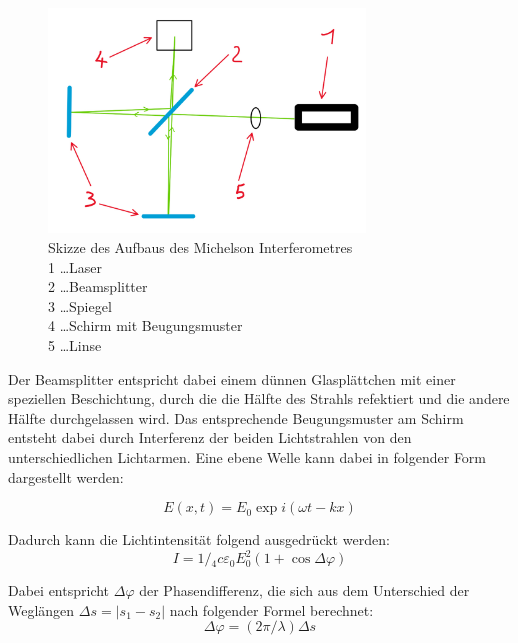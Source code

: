 \documentclass[12pt,english,ngerman]{scrartcl}
\begin{document}
\begin{figure}[H]
	\begin{center}
		\includegraphics[width =0.75\textwidth]{./figures/aufbau_interferometer_skizze.jpg}
	\end{center}
	\caption[Skizze des Aufbaus des Michelson Interferometres] {Skizze des Aufbaus des
		Michelson Interferometres         \\
		1 \dots Laser                     \\
		2 \dots Beamsplitter              \\
		3 \dots Spiegel                   \\
		4 \dots Schirm mit Beugungsmuster \\
		5 \dots Linse
	}\label{fig:aufbau_interferometer_skizze}
\end{figure}

Der Beamsplitter entspricht dabei einem dünnen Glasplättchen mit einer
speziellen Beschichtung, durch die die Hälfte des Strahls refektiert und die
andere Hälfte durchgelassen wird. Das entsprechende Beugungsmuster am Schirm
entsteht dabei durch Interferenz der beiden Lichtstrahlen von den
unterschiedlichen Lichtarmen. Eine ebene Welle kann dabei in folgender Form
dargestellt werden:

\begin{equation}
	E(x, t)=E_0 \exp i(\omega t-k x)
\end{equation}

Dadurch kann die Lichtintensität folgend ausgedrückt werden:
\begin{equation}
	I=1 /{ }_4 c \varepsilon_0 E_0^2(1+\cos \Delta \varphi)
\end{equation}

Dabei entspricht $\Delta \varphi$ der Phasendifferenz, die sich aus dem
Unterschied der Weglängen $\Delta s=\left|s_1-s_2\right|$ nach folgender Formel
berechnet:
\begin{equation}
	\Delta \varphi=(2 \pi / \lambda) \Delta s
\end{equation}
\end{document}
